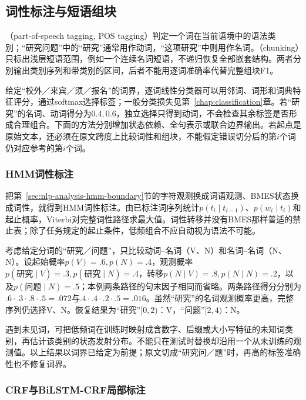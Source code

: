 \subsection{词性标注与短语组块}
\label{sec:nlp-analysis-pos-chunk}

（part-of-speech tagging, POS tagging）判定一个词在当前语境中的语法类别；“研究问题”中的“研究”通常用作动词，“这项研究”中则用作名词。（chunking）只标出浅层短语范围，例如一个连续名词短语，不递归恢复全部嵌套结构。两者分别输出类别序列和带类别的区间，后者不能用逐词准确率代替完整组块F1。

给定“校外／来宾／须／报名”的词界，逐词线性分类器可以用邻词、词形和词典特征评分，通过softmax选择标签；一般分类损失见第~\ref{chap:classification}章。若“研究”的名词、动词得分为$0.4,0.6$，独立选择只得到动词，不会检查其余标签是否形成合理组合。下面的方法分别增加状态依赖、全句表示或联合边界输出。若起点是原始文本，还必须在原文跨度上比较词性和组块，不能假定错误切分后的第$i$个词仍对应参考的第$i$个词。

\subsubsection{HMM词性标注}
\label{sec:nlp-analysis-hmm-pos}

把第~\ref{sec:nlp-analysis-hmm-boundary}节的字符观测换成词语观测、BMES状态换成词性，就得到HMM词性标注。由已标注词序列统计$p(t_i\mid t_{i-1})$、$p(w_i\mid t_i)$和起止概率，Viterbi对完整词性路径求最大值。词性转移并没有BMES那样普适的禁止表；除了任务规定的起止条件，低频组合不应自动视为语法不可能。

考虑给定分词的“研究／问题”，只比较动词--名词（V、N）和名词--名词（N、N）。设起始概率$p(V)=.6,p(N)=.4$，观测概率$p(\text{研究}\mid V)=.3,p(\text{研究}\mid N)=.4$，转移$p(N\mid V)=.8,p(N\mid N)=.2$，以及$p(\text{问题}\mid N)=.5$；本例两条路径的句末因子相同而省略。两条路径得分分别为$.6\cdot.3\cdot.8\cdot.5=.072$与$.4\cdot.4\cdot.2\cdot.5=.016$。虽然“研究”的名词观测概率更高，完整序列仍选择V、N。恢复结果为“研究”$[0,2)$：V，“问题”$[2,4)$：N。

遇到未见词，可把低频词在训练时映射成含数字、后缀或大小写特征的未知词类别，再估计该类别的状态发射分布。不能只在测试时替换却沿用一个从未训练的观测值。以上结果以词界已给定为前提；原文切成“研究问／题”时，再高的标签准确性也不修复词界。

\subsubsection{CRF与BiLSTM-CRF局部标注}
\label{sec:nlp-analysis-crf-chunk}

